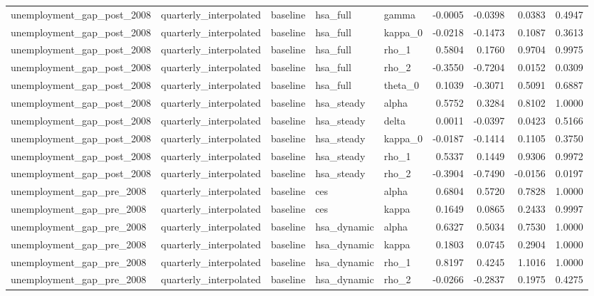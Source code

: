 \begin{tabular}{lllllrrrr}
unemployment\_gap\_post\_2008 & quarterly\_interpolated & baseline & hsa\_full & gamma & -0.0005 & -0.0398 & 0.0383 & 0.4947 \\
unemployment\_gap\_post\_2008 & quarterly\_interpolated & baseline & hsa\_full & kappa\_0 & -0.0218 & -0.1473 & 0.1087 & 0.3613 \\
unemployment\_gap\_post\_2008 & quarterly\_interpolated & baseline & hsa\_full & rho\_1 & 0.5804 & 0.1760 & 0.9704 & 0.9975 \\
unemployment\_gap\_post\_2008 & quarterly\_interpolated & baseline & hsa\_full & rho\_2 & -0.3550 & -0.7204 & 0.0152 & 0.0309 \\
unemployment\_gap\_post\_2008 & quarterly\_interpolated & baseline & hsa\_full & theta\_0 & 0.1039 & -0.3071 & 0.5091 & 0.6887 \\
unemployment\_gap\_post\_2008 & quarterly\_interpolated & baseline & hsa\_steady & alpha & 0.5752 & 0.3284 & 0.8102 & 1.0000 \\
unemployment\_gap\_post\_2008 & quarterly\_interpolated & baseline & hsa\_steady & delta & 0.0011 & -0.0397 & 0.0423 & 0.5166 \\
unemployment\_gap\_post\_2008 & quarterly\_interpolated & baseline & hsa\_steady & kappa\_0 & -0.0187 & -0.1414 & 0.1105 & 0.3750 \\
unemployment\_gap\_post\_2008 & quarterly\_interpolated & baseline & hsa\_steady & rho\_1 & 0.5337 & 0.1449 & 0.9306 & 0.9972 \\
unemployment\_gap\_post\_2008 & quarterly\_interpolated & baseline & hsa\_steady & rho\_2 & -0.3904 & -0.7490 & -0.0156 & 0.0197 \\
unemployment\_gap\_pre\_2008 & quarterly\_interpolated & baseline & ces & alpha & 0.6804 & 0.5720 & 0.7828 & 1.0000 \\
unemployment\_gap\_pre\_2008 & quarterly\_interpolated & baseline & ces & kappa & 0.1649 & 0.0865 & 0.2433 & 0.9997 \\
unemployment\_gap\_pre\_2008 & quarterly\_interpolated & baseline & hsa\_dynamic & alpha & 0.6327 & 0.5034 & 0.7530 & 1.0000 \\
unemployment\_gap\_pre\_2008 & quarterly\_interpolated & baseline & hsa\_dynamic & kappa & 0.1803 & 0.0745 & 0.2904 & 1.0000 \\
unemployment\_gap\_pre\_2008 & quarterly\_interpolated & baseline & hsa\_dynamic & rho\_1 & 0.8197 & 0.4245 & 1.1016 & 1.0000 \\
unemployment\_gap\_pre\_2008 & quarterly\_interpolated & baseline & hsa\_dynamic & rho\_2 & -0.0266 & -0.2837 & 0.1975 & 0.4275 \\

\end{tabular}
